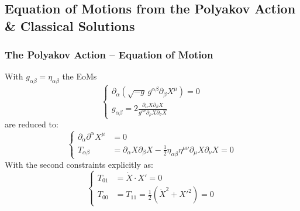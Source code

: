 \documentclass[aspectratio=169]{beamer}
\begin{document}
	\subsection{Equation of Motions from the Polyakov Action \& Classical Solutions}

	\begin{frame}
		\frametitle{The Polyakov Action -- Equation of Motion}
		With $g_{\alpha\beta} = \eta_{\alpha\beta}$ the EoMs
		\begin{equation*}
			\begin{cases}
				\partial_\alpha\left(\sqrt{-g}\,g^{\alpha\beta}\partial_\beta X^{\mu}\right) = 0 \\
				g_{\alpha\beta} =  2 \frac{\partial_\alpha X \partial_\beta X}{g^{\rho\sigma}\partial_\rho X \partial_\sigma X}
			\end{cases}
		\end{equation*}
		are reduced to:
		\begin{equation*}
			\begin{cases}
				\partial_\alpha\partial^\alpha X^{\mu} & = 0 \\
				T_{\alpha\beta} &= \partial_\alpha X \partial_\beta X - \frac{1}{2} \eta_{\alpha\beta} \eta^{\mu\nu} \partial_\mu X \partial_\nu X = 0
			\end{cases}
		\end{equation*}
		With the second constraints explicitly as:
		\begin{equation*}
			\begin{cases}
			T_{01} &= \dot{X}\cdot X' = 0 \\
			T_{00} &= T_{11} = \frac{1}{2} \left(\dot{X}^2 + X'^2 \right) = 0
			\end{cases}
		\end{equation*}
	\end{frame}	
\end{document}
